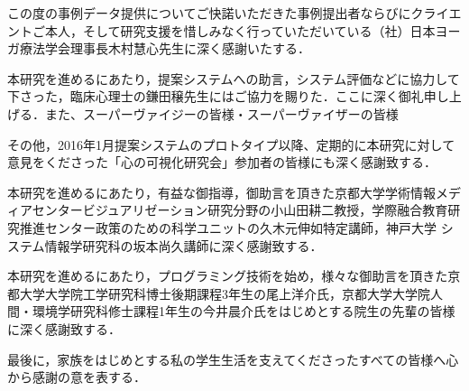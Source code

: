 \documentclass[shuuron]{kuee}
\begin{document}
\begin{acknowledgements}
  この度の事例データ提供についてご快諾いただきた事例提出者ならびにクライエントご本人，そして研究支援を惜しみなく行っていただいている（社）日本ヨーガ療法学会理事長木村慧心先生に深く感謝いたする．

本研究を進めるにあたり，提案システムへの助言，システム評価などに協力して下さった，臨床心理士の鎌田穣先生にはご協力を賜りた．ここに深く御礼申し上げる．また、スーパーヴァイジーの皆様・スーパーヴァイザーの皆様

その他，2016年1月提案システムのプロトタイプ以降、定期的に本研究に対して意見をくださった「心の可視化研究会」参加者の皆様にも深く感謝致する．

本研究を進めるにあたり，有益な御指導，御助言を頂きた京都大学学術情報メディアセンタービジュアリゼーション研究分野の小山田耕二教授，学際融合教育研究推進センター政策のための科学ユニットの久木元伸如特定講師，神戸大学 システム情報学研究科の坂本尚久講師に深く感謝致する．



本研究を進めるにあたり，プログラミング技術を始め，様々な御助言を頂きた京都大学大学院工学研究科博士後期課程3年生の尾上洋介氏，京都大学大学院人間・環境学研究科修士課程1年生の今井晨介氏をはじめとする院生の先輩の皆様に深く感謝致する．

最後に，家族をはじめとする私の学生生活を支えてくださったすべての皆様へ心から感謝の意を表する．
\end{acknowledgements}





\end{document}
